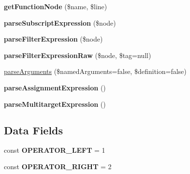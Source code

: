 \begin{DoxyCompactItemize}
\item 
\hypertarget{class_twig___expression_parser_acf5750a843dfd9532b700e0e28c83381}{}{\bfseries get\+Function\+Node} (\$name, \$line)\label{class_twig___expression_parser_acf5750a843dfd9532b700e0e28c83381}

\item 
\hypertarget{class_twig___expression_parser_a39de613eaf1404c8b0e3e676feaf5131}{}{\bfseries parse\+Subscript\+Expression} (\$node)\label{class_twig___expression_parser_a39de613eaf1404c8b0e3e676feaf5131}

\item 
\hypertarget{class_twig___expression_parser_aa34dd7e6733af986a5d59be68e0cc24e}{}{\bfseries parse\+Filter\+Expression} (\$node)\label{class_twig___expression_parser_aa34dd7e6733af986a5d59be68e0cc24e}

\item 
\hypertarget{class_twig___expression_parser_a042523e3f2021f368ceee6ce9fd2ea0e}{}{\bfseries parse\+Filter\+Expression\+Raw} (\$node, \$tag=null)\label{class_twig___expression_parser_a042523e3f2021f368ceee6ce9fd2ea0e}

\item 
\hyperlink{class_twig___expression_parser_ab55e89493a082dc4ec12ebf98482f066}{parse\+Arguments} (\$named\+Arguments=false, \$definition=false)
\item 
\hypertarget{class_twig___expression_parser_a9d63b236eb972c8932a82eb72b6b74d2}{}{\bfseries parse\+Assignment\+Expression} ()\label{class_twig___expression_parser_a9d63b236eb972c8932a82eb72b6b74d2}

\item 
\hypertarget{class_twig___expression_parser_a723d955922d5703cae23f36dcdbfdc06}{}{\bfseries parse\+Multitarget\+Expression} ()\label{class_twig___expression_parser_a723d955922d5703cae23f36dcdbfdc06}

\end{DoxyCompactItemize}
\subsection*{Data Fields}
\begin{DoxyCompactItemize}
\item 
\hypertarget{class_twig___expression_parser_abe5a3390382bf3aba3867940eec28a61}{}const {\bfseries O\+P\+E\+R\+A\+T\+O\+R\+\_\+\+L\+E\+F\+T} = 1\label{class_twig___expression_parser_abe5a3390382bf3aba3867940eec28a61}

\item 
\hypertarget{class_twig___expression_parser_a90a1202797b2ac98156a907ac86d0052}{}const {\bfseries O\+P\+E\+R\+A\+T\+O\+R\+\_\+\+R\+I\+G\+H\+T} = 2\label{class_twig___expression_parser_a90a1202797b2ac98156a907ac86d0052}

\end{DoxyCompactItemize}
